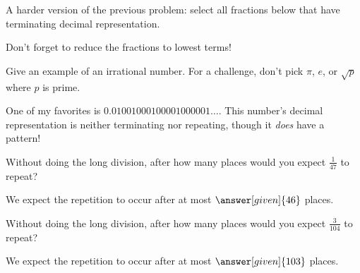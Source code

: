 \documentclass[nooutcomes]{ximera}
\begin{document}
\begin{problem}
A harder version of the previous problem: select all fractions below that have terminating decimal representation.
\begin{selectAll}
\end{selectAll}
\begin{hint}
Don't forget to reduce the fractions to lowest terms!
\end{hint}
\end{problem}



\begin{problem}
Give an example of an irrational number.  For a challenge, don't pick $\pi$, $e$, or $\sqrt{p}$ where $p$ is prime.

\begin{freeResponse}
\begin{hint}
One of my favorites is $0.01001000100001000001\dots$.  This number's decimal representation is neither terminating nor repeating, though it {\em does} have a pattern!
\end{hint}
\end{freeResponse}

\end{problem}



\begin{problem}
Without doing the long division, after how many places would you expect $\frac{1}{47}$ to repeat?

\begin{prompt}
We expect the repetition to occur after at most $\answer[given]{46}$ places.
\end{prompt}
\end{problem}


\begin{problem}
Without doing the long division, after how many places would you expect $\frac{3}{104}$ to repeat?

\begin{prompt}
We expect the repetition to occur after at most $\answer[given]{103}$ places.
\end{prompt}
\end{problem}
\end{document}
